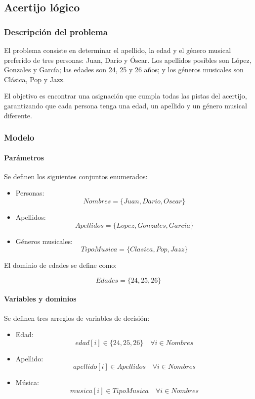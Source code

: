 \subsection{Acertijo lógico}

\subsubsection{Descripción del problema}

El problema consiste en determinar el apellido, la edad y el género musical preferido de tres personas: Juan, Darío y Óscar. Los apellidos posibles son López, Gonzales y García; las edades son 24, 25 y 26 años; y los géneros musicales son Clásica, Pop y Jazz.

El objetivo es encontrar una asignación que cumpla todas las pistas del acertijo, garantizando que cada persona tenga una edad, un apellido y un género musical diferente.

\subsubsection{Modelo}

\paragraph{Parámetros}

Se definen los siguientes conjuntos enumerados:

\begin{itemize}
    \item Personas:
    \[
    Nombres = \{Juan, Dario, Oscar\}
    \]
    \item Apellidos:
    \[
    Apellidos = \{Lopez, Gonzales, Garcia\}
    \]
    \item Géneros musicales:
    \[
    TipoMusica = \{Clasica, Pop, Jazz\}
    \]
\end{itemize}

El dominio de edades se define como:

\[
Edades = \{24,25,26\}
\]

\paragraph{Variables y dominios}

Se definen tres arreglos de variables de decisión:

\begin{itemize}
    \item Edad:
    \[
    edad[i] \in \{24,25,26\}
    \quad \forall i \in Nombres
    \]

    \item Apellido:
    \[
    apellido[i] \in Apellidos
    \quad \forall i \in Nombres
    \]

    \item Música:
    \[
    musica[i] \in TipoMusica
    \quad \forall i \in Nombres
    \]
\end{itemize}

